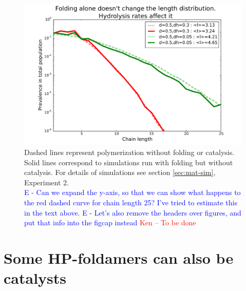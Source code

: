 \documentclass[journal=jacsat,manuscript=article,layout=twocolumn]{achemso}
\newcommand*{\red}[1]{\textcolor{red}{#1}}
\newcommand*{\blue}[1]{\textcolor{blue}{#1}}
\begin{document}
\begin{figure}[h!]
  \centering
  \includegraphics[width=\columnwidth]{pictures/flory-and-fold.pdf} 
  \caption{Dashed lines represent polymerization without folding or catalysis. Solid lines 
correspond to simulations run with folding but without catalysis. For details of simulations see 
section \ref{sec:mat-sim}, Experiment 2. \\
\blue{E - Can we expand the y-axis, 
so that we can show what happens to the red dashed curve for chain length 25?  I've tried to 
estimate this in the text above.}
\blue{E - Let's also remove the headers over figures, and put that info into the figcap instead}
\red{Ken -- To be done}}
  \label{fig:sim.flory-fold}
\end{figure}

\section{Some HP-foldamers can also be catalysts}
\end{document}
